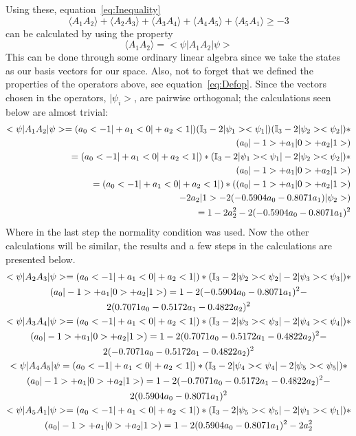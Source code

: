 \documentclass[
  utf8,%
  parskip,%
  largesmallcaps,intlimits,widermath,%
  sharecounter,nobreak,definition=marks,%
  noparts%
]{rtthesis}
\begin{document}
Using these, equation~\ref{eq:Inequality} 
\begin{equation*}
\langle A_1 A_2 \rangle + \langle A_2 A_3 \rangle + \langle A_3 A_4 \rangle + \langle A_4 A_5 \rangle +
\langle A_5 A_1 \rangle \geq -3
\end{equation*}
can be calculated by using the property
\begin{equation} 
\langle A_1 A_2 \rangle = <\psi|A_1 A_2|\psi>
\end{equation} 
This can be done through some ordinary linear algebra since we take the states as our basis vectors for our space. Also, not to forget that we defined the properties of the operators above, see equation~\ref{eq:Defop}. Since the vectors chosen in the operators, $|\psi_i>$, are pairwise orthogonal; the calculations seen below are almost trivial:
\begin{equation}
\begin{aligned}
<\psi|A_1 A_2|\psi>=(a_0<-1|+a_1<0|+a_2<1|)(\mathbb{I}_3-2|\psi_1><\psi_1|)(\mathbb{I}_3-2|\psi_2><\psi_2|)*
\\(a_0|-1>+a_1|0>+a_2|1>)
\\=(a_0<-1|+a_1<0|+a_2<1|)*(\mathbb{I}_3-2|\psi_1><\psi_1|-2|\psi_2><\psi_2|)*
\\(a_0|-1>+a_1|0>+a_2|1>)
\\=(a_0<-1|+a_1<0|+a_2<1|)*((a_0|-1>+a_1|0>+a_2|1>)
\\-2a_2|1>-2(-0.5904a_0-0.8071a_1)|\psi_2>)
\\=1-2a_2^2-2(-0.5904a_0-0.8071a_1)^2
\end{aligned}
\end{equation}
Where in the last step the normality condition was used. Now the other calculations will be similar, the results and a few steps in the calculations are presented below.
\begin{multline}
<\psi|A_2 A_3|\psi>=(a_0<-1|+a_1<0|+a_2<1|)*(\mathbb{I}_3-2|\psi_2><\psi_2|-2|\psi_3><\psi_3|)*
\\(a_0|-1>+a_1|0>+a_2|1>)=1-2(-0.5904a_0-0.8071a_1)^2-
\\2(0.7071a_0-0.5172a_1-0.4822a_2)^2
\\
<\psi|A_3 A_4|\psi>=(a_0<-1|+a_1<0|+a_2<1|)*(\mathbb{I}_3-2|\psi_3><\psi_3|-2|\psi_4><\psi_4|)*
\\(a_0|-1>+a_1|0>+a_2|1>)=1-2(0.7071a_0-0.5172a_1-0.4822a_2)^2-
\\2(-0.7071a_0-0.5172a_1-0.4822a_2)^2
\\
<\psi|A_4 A_5|\psi=(a_0<-1|+a_1<0|+a_2<1|)*(\mathbb{I}_3-2|\psi_4><\psi_4|-2|\psi_5><\psi_5|)*
\\(a_0|-1>+a_1|0>+a_2|1>)=1-2(-0.7071a_0-0.5172a_1-0.4822a_2)^2-
\\2(0.5904a_0-0.8071a_1)^2
\\
<\psi|A_5 A_1|\psi>=(a_0<-1|+a_1<0|+a_2<1|)*(\mathbb{I}_3-2|\psi_5><\psi_5|-2|\psi_1><\psi_1|)*
\\(a_0|-1>+a_1|0>+a_2|1>)=1-2(0.5904a_0-0.8071a_1)^2-2a_2^2
\end{multline}
\end{document}
